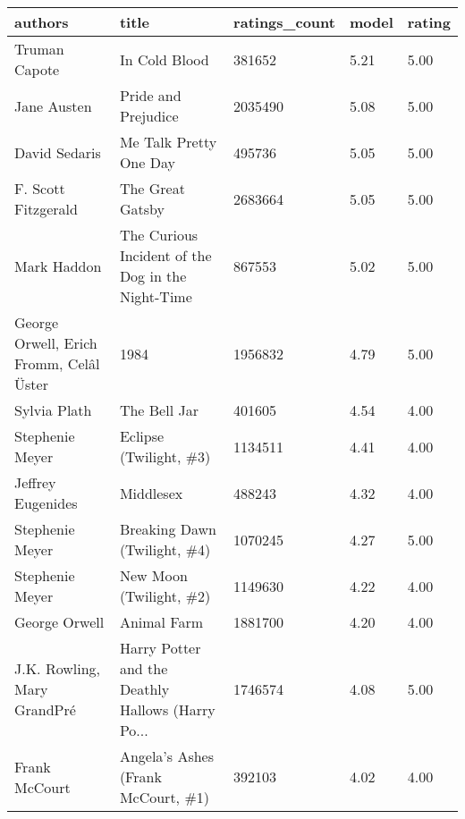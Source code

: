 \begin{tabular}{p{4cm}p{5cm}lll}
\toprule
                                 authors &                                              title &  ratings\_count &  model &  rating \\
\midrule
                           Truman Capote &                                      In Cold Blood &         381652 &   5.21 &    5.00 \\
                             Jane Austen &                                Pride and Prejudice &        2035490 &   5.08 &    5.00 \\
                           David Sedaris &                             Me Talk Pretty One Day &         495736 &   5.05 &    5.00 \\
                     F. Scott Fitzgerald &                                   The Great Gatsby &        2683664 &   5.05 &    5.00 \\
                             Mark Haddon &  The Curious Incident of the Dog in the Night-Time &         867553 &   5.02 &    5.00 \\
 George Orwell, Erich Fromm, Celâl Üster &                                               1984 &        1956832 &   4.79 &    5.00 \\
                            Sylvia Plath &                                       The Bell Jar &         401605 &   4.54 &    4.00 \\
                         Stephenie Meyer &                             Eclipse (Twilight, \#3) &        1134511 &   4.41 &    4.00 \\
                       Jeffrey Eugenides &                                          Middlesex &         488243 &   4.32 &    4.00 \\
                         Stephenie Meyer &                       Breaking Dawn (Twilight, \#4) &        1070245 &   4.27 &    5.00 \\
                         Stephenie Meyer &                            New Moon (Twilight, \#2) &        1149630 &   4.22 &    4.00 \\
                           George Orwell &                                        Animal Farm &        1881700 &   4.20 &    4.00 \\
             J.K. Rowling, Mary GrandPré &  Harry Potter and the Deathly Hallows (Harry Po... &        1746574 &   4.08 &    5.00 \\
                           Frank McCourt &                 Angela's Ashes (Frank McCourt, \#1) &         392103 &   4.02 &    4.00 \\

\end{tabular}
